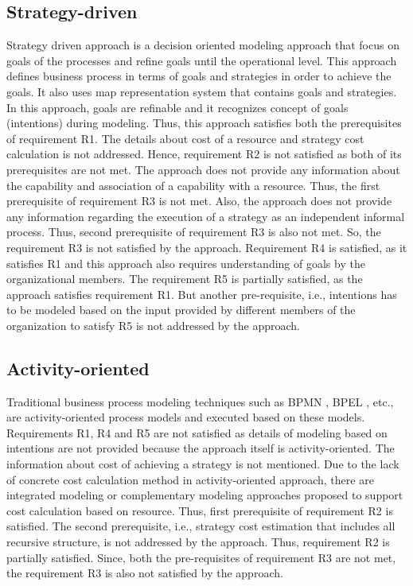 \subsection{Strategy-driven} 
Strategy driven approach is a decision oriented modeling approach that focus on goals of the processes and refine goals until the operational level. This approach defines business process in terms of goals and strategies in order to achieve the goals. It also uses map representation system that contains goals and strategies. In this approach, goals are refinable and it recognizes concept of goals (intentions) during modeling. Thus, this approach satisfies both the prerequisites of requirement R1. The details about cost of a resource and strategy cost calculation is not addressed. Hence, requirement R2 is not satisfied as both of its prerequisites are not met. The approach does not provide any information about the capability and association of a capability with a resource. Thus, the first prerequisite of requirement R3 is not met. Also, the approach does not provide any information regarding the execution of a strategy as an independent informal process. Thus, second prerequisite of requirement R3 is also not met. So, the requirement R3 is not satisfied by the approach. Requirement R4 is satisfied, as it satisfies R1 and this approach also requires understanding of goals by the organizational members. The requirement R5 is partially satisfied, as the approach satisfies requirement R1. But another pre-requisite, i.e., intentions has to be modeled based on the input provided by different members of the organization to satisfy R5 is not addressed by the approach. 

\subsection{Activity-oriented} 
Traditional business process modeling techniques such as BPMN \cite{bpm2011}, BPEL \cite{Std.2007}, etc., are activity-oriented process models and executed based on these models. Requirements R1, R4 and R5 are not satisfied as details of modeling based on intentions are not provided because the approach itself is activity-oriented. The information about cost of achieving a strategy is not mentioned. Due to the lack of concrete cost calculation method in activity-oriented approach, there are integrated modeling or complementary modeling approaches \cite{Bankhofer2013,Sampathkumaran2013} proposed to support cost calculation based on resource. Thus, first prerequisite of requirement R2 is satisfied. The second prerequisite, i.e., strategy cost estimation that includes all recursive structure, is not addressed by the approach. Thus, requirement R2 is partially satisfied. Since, both the pre-requisites of requirement R3 are not met, the requirement R3 is also not satisfied by the approach. 

